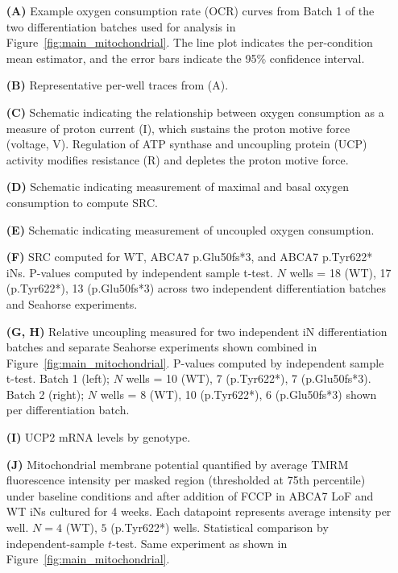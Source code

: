  \begin{itemize}
    \item[\textbf{(A)}] Example oxygen consumption rate (OCR) curves from Batch 1 of the two differentiation batches used for analysis in Figure~\ref{fig:main_mitochondrial}. The line plot indicates the per-condition mean estimator, and the error bars indicate the 95\% confidence interval. 
    \item[\textbf{(B)}] Representative per-well traces from (A). 
    \item[\textbf{(C)}] Schematic indicating the relationship between oxygen consumption as a measure of proton current (I), which sustains the proton motive force (voltage, V). Regulation of ATP synthase and uncoupling protein (UCP) activity modifies resistance (R) and depletes the proton motive force.
    \item[\textbf{(D)}] Schematic indicating measurement of maximal and basal oxygen consumption to compute SRC.
    \item[\textbf{(E)}] Schematic indicating measurement of uncoupled oxygen consumption.
    \item[\textbf{(F)}] SRC computed for WT, ABCA7 p.Glu50fs*3, and ABCA7 p.Tyr622* iNs. P-values computed by independent sample t-test. $N$ wells = 18 (WT), 17 (p.Tyr622*), 13 (p.Glu50fs*3) across two independent differentiation batches and Seahorse experiments. 
    \item[\textbf{(G, H)}] Relative uncoupling measured for two independent iN differentiation batches and separate Seahorse experiments shown combined in Figure~\ref{fig:main_mitochondrial}. P-values computed by independent sample t-test. Batch 1 (left); $N$ wells = 10 (WT), 7 (p.Tyr622*), 7 (p.Glu50fs*3). Batch 2 (right); $N$ wells = 8 (WT), 10 (p.Tyr622*), 6 (p.Glu50fs*3) shown per differentiation batch.
    \item[\textbf{(I)}] UCP2 mRNA levels by genotype. 
    \item[\textbf{(J)}] Mitochondrial membrane potential quantified by average TMRM fluorescence intensity per masked region (thresholded at 75th percentile) under baseline conditions and after addition of FCCP in ABCA7 LoF and WT iNs cultured for 4 weeks. Each datapoint represents average intensity per well. $N=4$ (WT), $5$ (p.Tyr622*) wells. Statistical comparison by independent-sample $t$-test. Same experiment as shown in Figure~\ref{fig:main_mitochondrial}.
 \end{itemize}